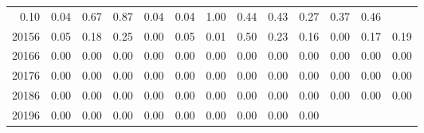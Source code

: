 \begin{table}[!h]
\begin{tabular}{lllllllllllll}
  \multicolumn{1}{|r}{0.10} &
  \multicolumn{1}{r}{0.04} &
  \multicolumn{1}{r}{0.67} &
  \multicolumn{1}{r}{0.87} &
  \multicolumn{1}{r}{0.04} &
  \multicolumn{1}{r}{0.04} &
  \multicolumn{1}{r}{1.00} &
  \multicolumn{1}{r}{0.44} &
  \multicolumn{1}{r}{0.43} &
  \multicolumn{1}{r}{0.27} &
  \multicolumn{1}{r}{0.37} &
  \multicolumn{1}{r}{0.46} \\
\multicolumn{1}{l}{\hspace{1em}20156} &
  \multicolumn{1}{|r}{0.05} &
  \multicolumn{1}{r}{0.18} &
  \multicolumn{1}{r}{0.25} &
  \multicolumn{1}{r}{0.00} &
  \multicolumn{1}{r}{0.05} &
  \multicolumn{1}{r}{0.01} &
  \multicolumn{1}{r}{0.50} &
  \multicolumn{1}{r}{0.23} &
  \multicolumn{1}{r}{0.16} &
  \multicolumn{1}{r}{0.00} &
  \multicolumn{1}{r}{0.17} &
  \multicolumn{1}{r}{0.19} \\
\multicolumn{1}{l}{\hspace{1em}20166} &
  \multicolumn{1}{|r}{0.00} &
  \multicolumn{1}{r}{0.00} &
  \multicolumn{1}{r}{0.00} &
  \multicolumn{1}{r}{0.00} &
  \multicolumn{1}{r}{0.00} &
  \multicolumn{1}{r}{0.00} &
  \multicolumn{1}{r}{0.00} &
  \multicolumn{1}{r}{0.00} &
  \multicolumn{1}{r}{0.00} &
  \multicolumn{1}{r}{0.00} &
  \multicolumn{1}{r}{0.00} &
  \multicolumn{1}{r}{0.00} \\
\multicolumn{1}{l}{\hspace{1em}20176} &
  \multicolumn{1}{|r}{0.00} &
  \multicolumn{1}{r}{0.00} &
  \multicolumn{1}{r}{0.00} &
  \multicolumn{1}{r}{0.00} &
  \multicolumn{1}{r}{0.00} &
  \multicolumn{1}{r}{0.00} &
  \multicolumn{1}{r}{0.00} &
  \multicolumn{1}{r}{0.00} &
  \multicolumn{1}{r}{0.00} &
  \multicolumn{1}{r}{0.00} &
  \multicolumn{1}{r}{0.00} &
  \multicolumn{1}{r}{0.00} \\
\multicolumn{1}{l}{\hspace{1em}20186} &
  \multicolumn{1}{|r}{0.00} &
  \multicolumn{1}{r}{0.00} &
  \multicolumn{1}{r}{0.00} &
  \multicolumn{1}{r}{0.00} &
  \multicolumn{1}{r}{0.00} &
  \multicolumn{1}{r}{0.00} &
  \multicolumn{1}{r}{0.00} &
  \multicolumn{1}{r}{0.00} &
  \multicolumn{1}{r}{0.00} &
  \multicolumn{1}{r}{0.00} &
  \multicolumn{1}{r}{0.00} &
  \multicolumn{1}{r}{0.00} \\
\multicolumn{1}{l}{\hspace{1em}20196} &
  \multicolumn{1}{|r}{0.00} &
  \multicolumn{1}{r}{0.00} &
  \multicolumn{1}{r}{0.00} &
  \multicolumn{1}{r}{0.00} &
  \multicolumn{1}{r}{0.00} &
  \multicolumn{1}{r}{0.00} &
  \multicolumn{1}{r}{0.00} &
  \multicolumn{1}{r}{0.00} &
  \multicolumn{1}{r}{0.00} &

\end{tabular}
\end{table}
